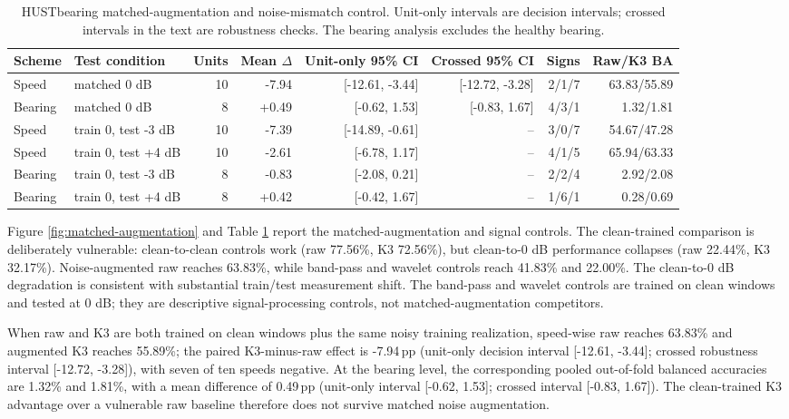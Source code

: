 \documentclass[11pt]{article}
\newcommand{\SI}[2]{#1\,\ensuremath{#2}}
\newcommand{\pp}{\mathrm{pp}}
\begin{document}
\begin{table}[t]
\centering
\caption{HUSTbearing matched-augmentation and noise-mismatch control. Unit-only
intervals are decision intervals; crossed intervals in the text are robustness
checks. The bearing analysis excludes the healthy bearing.}
\label{tab:matched-augmentation}
\scriptsize
\begin{tabular}{@{}llrrrrrr@{}}
\toprule
Scheme & Test condition & Units & Mean $\Delta$ & Unit-only 95\% CI & Crossed 95\% CI & Signs & Raw/K3 BA \\
\midrule
Speed & matched 0 dB & 10 & -7.94 & [-12.61, -3.44] & [-12.72, -3.28] & 2/1/7 & 63.83/55.89 \\
Bearing & matched 0 dB & 8 & +0.49 & [-0.62, 1.53] & [-0.83, 1.67] & 4/3/1 & 1.32/1.81 \\
Speed & train 0, test -3 dB & 10 & -7.39 & [-14.89, -0.61] & -- & 3/0/7 & 54.67/47.28 \\
Speed & train 0, test +4 dB & 10 & -2.61 & [-6.78, 1.17] & -- & 4/1/5 & 65.94/63.33 \\
Bearing & train 0, test -3 dB & 8 & -0.83 & [-2.08, 0.21] & -- & 2/2/4 & 2.92/2.08 \\
Bearing & train 0, test +4 dB & 8 & +0.42 & [-0.42, 1.67] & -- & 1/6/1 & 0.28/0.69 \\
\bottomrule
\end{tabular}
\end{table}

Figure \ref{fig:matched-augmentation} and Table
\ref{tab:matched-augmentation} report the matched-augmentation and signal
controls. The clean-trained comparison is deliberately vulnerable: clean-to-clean
controls work (raw 77.56\%, K3 72.56\%), but clean-to-0 dB performance collapses
(raw 22.44\%, K3 32.17\%). Noise-augmented raw reaches 63.83\%, while
band-pass and wavelet controls reach 41.83\% and 22.00\%. The clean-to-0 dB
degradation is consistent with substantial train/test measurement shift. The
band-pass and wavelet controls are trained on clean windows and tested at
0 dB; they are descriptive signal-processing controls, not
matched-augmentation competitors.

When raw and K3 are both trained on clean windows plus the same noisy training
realization, speed-wise raw reaches 63.83\% and augmented K3 reaches 55.89\%;
the paired K3-minus-raw effect is \SI{-7.94}{\pp} (unit-only decision interval
[-12.61, -3.44]; crossed robustness interval [-12.72, -3.28]), with seven of
ten speeds negative. At the bearing level, the corresponding pooled
out-of-fold balanced accuracies are 1.32\% and 1.81\%, with a mean difference
of \SI{0.49}{\pp} (unit-only interval [-0.62, 1.53]; crossed interval
[-0.83, 1.67]). The clean-trained K3 advantage over a vulnerable raw baseline
therefore does not survive matched noise augmentation.
\end{document}
